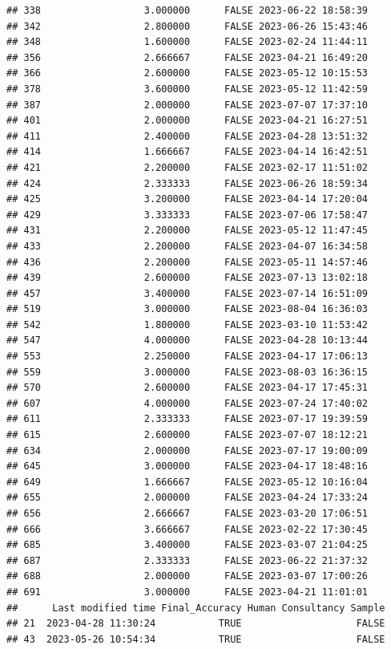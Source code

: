 \documentclass[
]{article}
\begin{document}
\begin{verbatim}
## 338                  3.000000      FALSE 2023-06-22 18:58:39
## 342                  2.800000      FALSE 2023-06-26 15:43:46
## 348                  1.600000      FALSE 2023-02-24 11:44:11
## 356                  2.666667      FALSE 2023-04-21 16:49:20
## 366                  2.600000      FALSE 2023-05-12 10:15:53
## 378                  3.600000      FALSE 2023-05-12 11:42:59
## 387                  2.000000      FALSE 2023-07-07 17:37:10
## 401                  2.000000      FALSE 2023-04-21 16:27:51
## 411                  2.400000      FALSE 2023-04-28 13:51:32
## 414                  1.666667      FALSE 2023-04-14 16:42:51
## 421                  2.200000      FALSE 2023-02-17 11:51:02
## 424                  2.333333      FALSE 2023-06-26 18:59:34
## 425                  3.200000      FALSE 2023-04-14 17:20:04
## 429                  3.333333      FALSE 2023-07-06 17:58:47
## 431                  2.200000      FALSE 2023-05-12 11:47:45
## 433                  2.200000      FALSE 2023-04-07 16:34:58
## 436                  2.200000      FALSE 2023-05-11 14:57:46
## 439                  2.600000      FALSE 2023-07-13 13:02:18
## 457                  3.400000      FALSE 2023-07-14 16:51:09
## 519                  3.000000      FALSE 2023-08-04 16:36:03
## 542                  1.800000      FALSE 2023-03-10 11:53:42
## 547                  4.000000      FALSE 2023-04-28 10:13:44
## 553                  2.250000      FALSE 2023-04-17 17:06:13
## 559                  3.000000      FALSE 2023-08-03 16:36:15
## 570                  2.600000      FALSE 2023-04-17 17:45:31
## 607                  4.000000      FALSE 2023-07-24 17:40:02
## 611                  2.333333      FALSE 2023-07-17 19:39:59
## 615                  2.600000      FALSE 2023-07-07 18:12:21
## 634                  2.000000      FALSE 2023-07-17 19:00:09
## 645                  3.000000      FALSE 2023-04-17 18:48:16
## 649                  1.666667      FALSE 2023-05-12 10:16:04
## 655                  2.000000      FALSE 2023-04-24 17:33:24
## 656                  2.666667      FALSE 2023-03-20 17:06:51
## 666                  3.666667      FALSE 2023-02-22 17:30:45
## 685                  3.400000      FALSE 2023-03-07 21:04:25
## 687                  2.333333      FALSE 2023-06-22 21:37:32
## 688                  2.000000      FALSE 2023-03-07 17:00:26
## 691                  3.000000      FALSE 2023-04-21 11:01:01
##      Last modified time Final_Accuracy Human Consultancy Sample
## 21  2023-04-28 11:30:24           TRUE                    FALSE
## 43  2023-05-26 10:54:34           TRUE                    FALSE

\end{verbatim}
\end{document}
